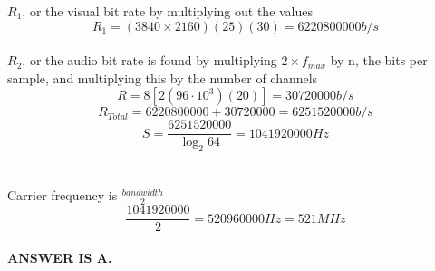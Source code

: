 \documentclass[12pt]{article}
\begin{document}
\(R_1\), or the visual bit rate by multiplying out the values\\
\[R_1 = (3840 \times 2160)(25)(30) = 6220800000b/s\]\\
\(R_2\), or the audio bit rate is found by multiplying \(2 \times f_{max}\) by n, the bits per sample, and multiplying this by the number of channels\\
\[R = 8[2(96\cdot 10^3)(20)] = 30720000b/s\]
\[R_{Total} = 6220800000 + 30720000 = 6251520000b/s\]
\[S = \frac{6251520000}{\log_2 64} = 1041920000Hz\]\\
\\
Carrier frequency is \(\frac{bandwidth}{2}\)
\[\frac{1041920000}{2} = 520960000Hz = 521MHz\]
\\
\textbf{ANSWER IS A.}
\end{document}
